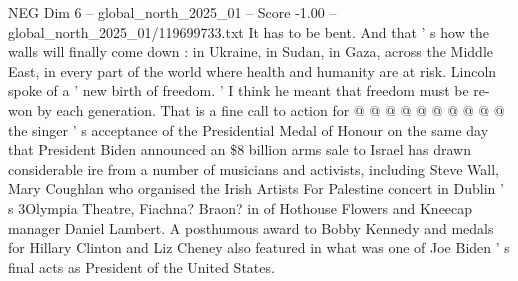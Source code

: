 \begin{textsample}{NEG Dim 6 – global\_north\_2025\_01 – Score -1.00 – global\_north\_2025\_01/119699733.txt}
It has to be bent.
And that ' s how the walls will finally come down : in Ukraine, in Sudan, in Gaza, across the Middle East, in every part of the world where health and humanity are at risk.
Lincoln spoke of a ' new birth of freedom. ' I think he meant that freedom must be re-won by each generation.
That is a fine call to action for @ @ @ @ @ @ @ @ @ @ the singer ' s acceptance of the Presidential Medal of Honour on the same day that President Biden announced an \$8 billion arms sale to Israel has drawn considerable ire from a number of musicians and activists, including Steve Wall, Mary Coughlan who organised the Irish Artists For Palestine concert in Dublin ' s 3Olympia Theatre, Fiachna?
Braon? in of Hothouse Flowers and Kneecap manager Daniel Lambert.
A posthumous award to Bobby Kennedy and medals for Hillary Clinton and Liz Cheney also featured in what was one of Joe Biden ' s final acts as President of the United States.

\end{textsample}
